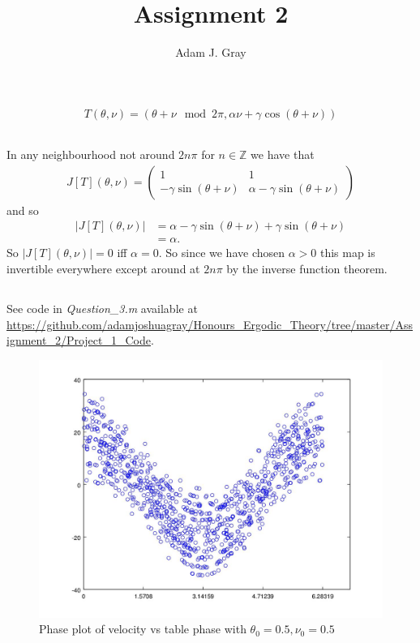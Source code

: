 \documentclass{unswmaths}
\begin{document}
\author{Adam J. Gray}
\title{Assignment 2}
\subject{Ergodic Theory}

\unswtitle

\section{}
\subsection{}
\begin{align*}
    T(\theta, \nu) = (\theta + \nu \mod 2\pi, \alpha\nu + \gamma \cos(\theta + \nu))
\end{align*}
\subsection{}
In any neighbourhood not around $ 2n\pi $ for $ n \in \mathbb{Z} $ we have that
\begin{align*}
    J[T](\theta, \nu) = \left( 
    \begin{array}{cc}
        1   & 1 \\
        -\gamma \sin(\theta + \nu) & \alpha - \gamma\sin(\theta + \nu)
    \end{array}
    \right)
\end{align*}
and so
\begin{align*}
|J[T](\theta, \nu)| &= \alpha - \gamma\sin(\theta + \nu) + \gamma\sin(\theta + \nu) \\
    &= \alpha.
\end{align*}
So $ |J[T](\theta, \nu)| = 0 $ iff $ \alpha = 0 $. So since we have chosen $ \alpha > 0 $ this map is invertible everywhere except around at $ 2n\pi $ by the inverse function theorem.
\subsection{}

See code in \emph{Question\_3.m} available at \url{https://github.com/adamjoshuagray/Honours_Ergodic_Theory/tree/master/Assignment_2/Project_1_Code}.
\begin{figure}[h]
    \includegraphics[scale=0.5]{Question_3}
    \caption{Phase plot of velocity vs table phase with $ \theta_0 = 0.5, \nu_0 = 0.5 $}
\end{figure}
\end{document}
